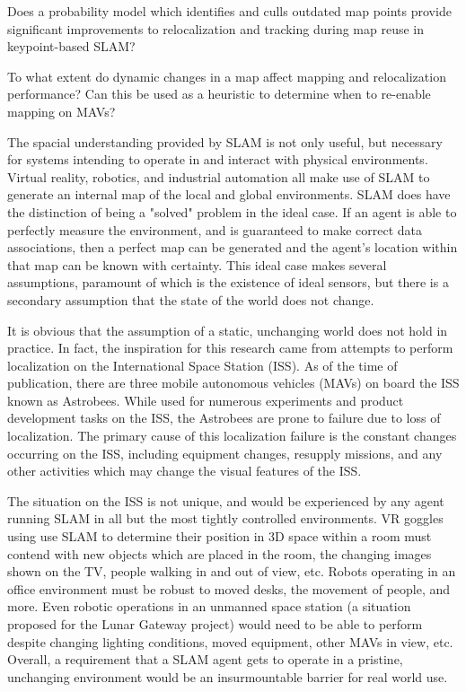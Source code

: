 Does a probability model which identifies and culls outdated map points provide significant improvements to relocalization and tracking during map reuse in keypoint-based SLAM?

To what extent do dynamic changes in a map affect mapping and relocalization performance?
Can this be used as a heuristic to determine when to re-enable mapping on MAVs?

The spacial understanding provided by SLAM is not only useful, but necessary for systems intending to operate in and interact with physical environments. Virtual reality, robotics, and industrial automation all make use of SLAM to generate an internal map of the local and global environments. SLAM does have the distinction of being a "solved" problem in the ideal case. If an agent is able to perfectly measure the environment, and is guaranteed to make correct data associations, then a perfect map can be generated and the agent's location within that map can be known with certainty. This ideal case makes several assumptions, paramount of which is the existence of ideal sensors, but there is a secondary assumption that the state of the world does not change.

It is obvious that the assumption of a static, unchanging world does not hold in practice. In fact, the inspiration for this research came from attempts to perform localization on the International Space Station (ISS). As of the time of publication, there are three mobile autonomous vehicles (MAVs) on board the ISS known as Astrobees. While used for numerous experiments and product development tasks on the ISS, the Astrobees are prone to failure due to loss of localization. The primary cause of this localization failure is the constant changes occurring on the ISS, including equipment changes, resupply missions, and any other activities which may change the visual features of the ISS.

The situation on the ISS is not unique, and would be experienced by any agent running SLAM in all but the most tightly controlled environments. VR goggles using use SLAM to determine their position in 3D space within a room must contend with new objects which are placed in the room, the changing images shown on the TV, people walking in and out of view, etc. Robots operating in an office environment must be robust to moved desks, the movement of people, and more. Even robotic operations in an unmanned space station (a situation proposed for the Lunar Gateway project) would need to be able to perform despite changing lighting conditions, moved equipment, other MAVs in view, etc. Overall, a requirement that a SLAM agent gets to operate in a pristine, unchanging environment would be an insurmountable barrier for real world use.

